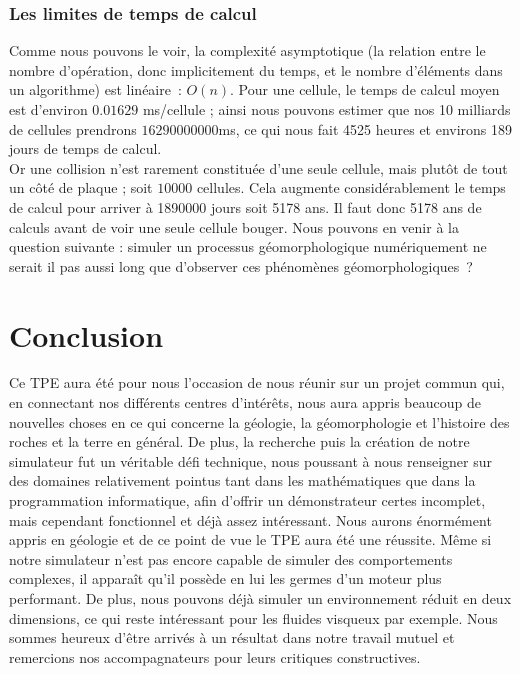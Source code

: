 \documentclass[a4paper,11pt]{article}
\begin{document}
\subsubsection{Les limites de temps de calcul}

\begin{center}
\end{center}

Comme nous pouvons le voir, la complexité asymptotique (la relation entre le nombre d'opération, donc implicitement du temps, et le nombre d'éléments dans un algorithme) est linéaire~: $O(n)$.
Pour une cellule, le temps de calcul moyen est d'environ $0.01629$ ms/cellule ; ainsi nous pouvons estimer que nos 10 milliards de cellules prendrons $16290000000$ms, ce qui nous fait 4525 heures et environs 189 jours de temps de calcul.\\
Or une collision n'est rarement constituée d'une seule cellule, mais plutôt de tout un côté de plaque ; soit $10000$ cellules.
Cela augmente considérablement le temps de calcul pour arriver à 1890000 jours soit 5178 ans.
Il faut donc 5178 ans de calculs avant de voir une seule cellule bouger.
Nous pouvons en venir à la question suivante : simuler un processus géomorphologique numériquement ne serait il pas aussi long que d'observer ces phénomènes géomorphologiques~?

\section{Conclusion}

Ce TPE aura été pour nous l'occasion de nous réunir sur un projet commun qui, en connectant nos différents centres d’intérêts, nous aura appris beaucoup de nouvelles choses en ce qui concerne la géologie, la géomorphologie et l'histoire des roches et la terre en général.
De plus, la recherche puis la création de notre simulateur fut un véritable défi technique, nous poussant à nous renseigner sur des domaines relativement pointus tant dans les mathématiques que dans la programmation informatique, afin d'offrir un démonstrateur certes incomplet, mais cependant fonctionnel et déjà assez intéressant.
Nous aurons énormément appris en géologie et de ce point de vue le TPE aura été une réussite.
Même si notre simulateur n'est pas encore capable de simuler des comportements complexes, il apparaît qu'il possède en lui les germes d'un moteur plus performant.
De plus, nous pouvons déjà simuler un environnement réduit en deux dimensions, ce qui reste intéressant pour les fluides visqueux par exemple.
Nous sommes heureux d'être arrivés à un résultat dans notre travail mutuel et remercions nos accompagnateurs pour leurs critiques constructives.
\end{document}
